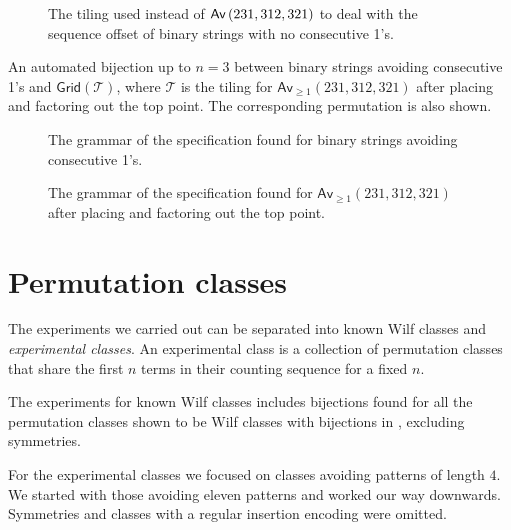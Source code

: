 \begin{figure}[ht!]
    \centering
    
    \caption{The tiling used instead of $\textsf{Av}\left(231,312,321\right)$ to deal with the sequence offset of binary strings with no consecutive 1's.}
    \label{fig:fibpermoffbyone}
\end{figure}

\begin{table}[ht!]
    \centering
    
    \caption{An automated bijection up to $n=3$ between binary strings avoiding consecutive 1's and $\textsf{Grid}(\mathcal{T})$, where $\mathcal{T}$ is the tiling for $\textsf{Av}_{\geq1}(231,312,321)$ after placing and factoring out the top point. The corresponding permutation is also shown.}
    \label{tab:wordtilmap}
\end{table}

\begin{figure}
    \centering
    
    \vspace*{-12.5mm}
    \caption{The grammar of the specification found for binary strings avoiding consecutive 1's.}
    \label{fig:fibwordtree}
\end{figure}
\begin{figure}
    \centering
    
    \vspace*{-14mm}
    \caption{The grammar of the specification found for $\textsf{Av}_{\geq1}(231,312,321)$ after placing and factoring out the top point.}
    \label{fig:fibpermtree}
\end{figure}

\section{Permutation classes}
The experiments we carried out can be separated into known Wilf classes and \emph{experimental classes}. An experimental class is a collection of permutation classes that share the first $n$ terms in their counting sequence for a fixed $n$.

The experiments for known Wilf classes includes bijections found for all the permutation classes shown to be Wilf classes with bijections in , excluding symmetries.

For the experimental classes we focused on classes avoiding patterns of length $4$. We started with those avoiding eleven patterns and worked our way downwards. Symmetries and classes with a regular insertion encoding were omitted. 


